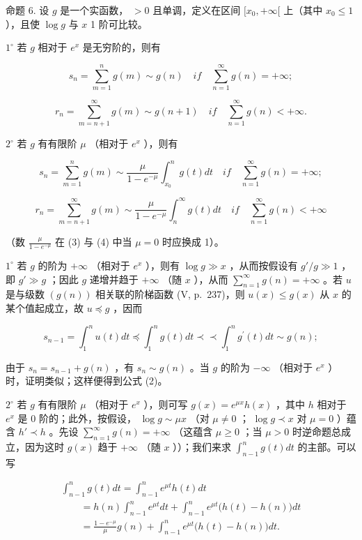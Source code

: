 命题 6. 设 \(g\) 是一个实函数， \(>0\) 且单调，定义在区间 \([x_0, +\infty[\) 上（其中 \(x_0 \leqslant 1\) ），且使 \(\log g\) 与 \(x\) 1 阶可比较。

\(1^{\circ}\) 若 \(g\) 相对于 \(e^{x}\) 是无穷阶的，则有

\[
s _ {n} = \sum_ {m = 1} ^ {n} g (m) \sim g (n) \quad i f \quad \sum_ {n = 1} ^ {\infty} g (n) = + \infty ;\tag{1}
\]

\[
r _ {n} = \sum_ {m = n + 1} ^ {\infty} g (m) \sim g (n + 1) \quad i f \quad \sum_ {n = 1} ^ {\infty} g (n) <   + \infty .\tag{2}
\]

\(2^{\circ}\) 若 \(g\) 有有限阶 \(\mu\) （相对于 \(e^{x}\) ），则有

\[
s _ {n} = \sum_ {m = 1} ^ {n} g (m) \sim \frac {\mu}{1 - e ^ {- \mu}} \int_ {x _ {0}} ^ {n} g (t) d t \quad i f \quad \sum_ {n = 1} ^ {\infty} g (n) = + \infty ;\tag{3}
\]

\[
r _ {n} = \sum_ {m = n + 1} ^ {\infty} g (m) \sim \frac {\mu}{1 - e ^ {- \mu}} \int_ {n} ^ {\infty} g (t) d t \quad i f \quad \sum_ {n = 1} ^ {\infty} g (n) <   + \infty\tag{4}
\]

（数 \(\frac{\mu}{1 - e^{-\mu}}\) 在 (3) 与 (4) 中当 \(\mu = 0\) 时应换成 1）。

\(1^{\circ}\) 若 \(g\) 的阶为 \(+\infty\) （相对于 \(e^{x}\) ），则有 \(\log g \gg x\) ，从而按假设有 \(g' / g \gg 1\) ，即 \(g' \gg g\) ；因此 \(g\) 递增并趋于 \(+\infty\) （随 \(x\) ），从而 \(\sum_{n=1}^{\infty} g(n) = +\infty\) 。若 \(u\) 是与级数 \((g(n))\) 相关联的阶梯函数 (V, p.~237)，则 \(u(x) \leqslant g(x)\) 从 \(x\) 的某个值起成立，故 \(u \preccurlyeq g\) ，因而

\[
s _ {n - 1} = \int_ {1} ^ {n} u (t) d t \preccurlyeq \int_ {1} ^ {n} g (t) d t \prec \prec \int_ {1} ^ {n} g ^ {\prime} (t) d t \sim g (n);
\]

由于 \(s_n = s_{n-1} + g(n)\) ，有 \(s_n \sim g(n)\) 。当 \(g\) 的阶为 \(-\infty\) （相对于 \(e^x\) ）时，证明类似；这样便得到公式 (2)。

\(2^{\circ}\) 若 \(g\) 有有限阶 \(\mu\) （相对于 \(e^{x}\) ），则可写 \(g(x) = e^{\mu x}h(x)\) ，其中 \(h\) 相对于 \(e^{x}\) 是 0 阶的；此外，按假设， \(\log g \sim \mu x\) （对 \(\mu \neq 0\) ； \(\log g \prec x\) 对 \(\mu = 0\) ）蕴含 \(h' \prec h\) 。先设 \(\sum_{n=1}^{\infty} g(n) = +\infty\) （这蕴含 \(\mu \geqslant 0\) ；当 \(\mu > 0\) 时逆命题总成立，因为这时 \(g(x)\) 趋于 \(+\infty\) （随 \(x\) ））；我们来求 \(\int_{n-1}^{n} g(t) dt\) 的主部。可以写

\[
\begin{array}{l} \int_ {n - 1} ^ {n} g (t) d t = \int_ {n - 1} ^ {n} e ^ {\mu t} h (t) d t \\ \qquad = h (n) \int_ {n - 1} ^ {n} e ^ {\mu t} d t + \int_ {n - 1} ^ {n} e ^ {\mu t} \big (h (t) - h (n) \big) d t \\ \qquad = \frac {1 - e ^ {- \mu}}{\mu} g (n) + \int_ {n - 1} ^ {n} e ^ {\mu t} \big (h (t) - h (n) \big) d t. \end{array}
\]

